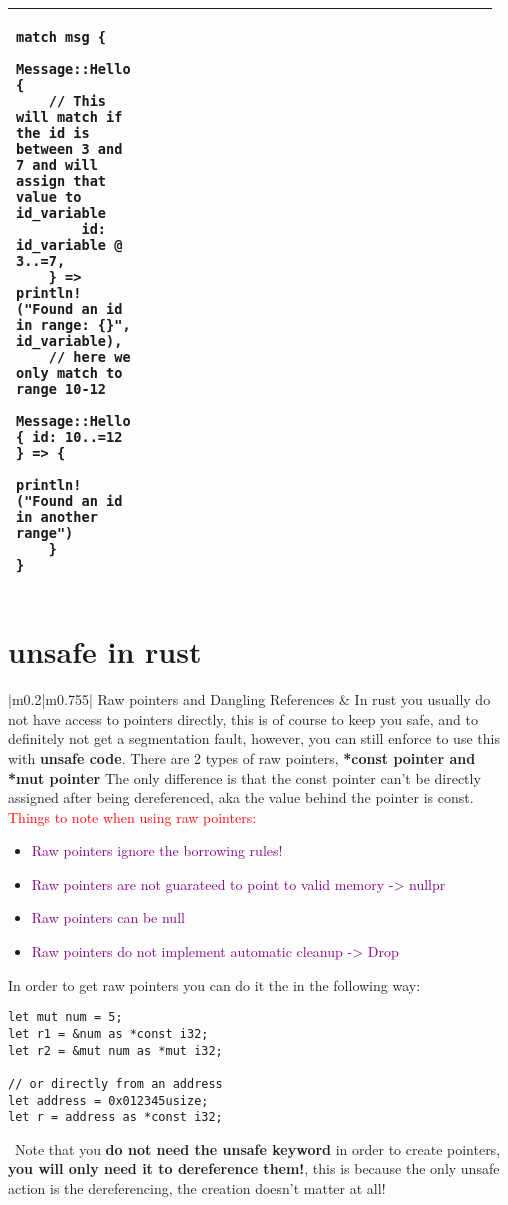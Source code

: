 \documentclass[main.tex,fontsize=8pt,paper=a4,paper=portrait,DIV=calc,]{scrartcl}
\begin{document}
\begin{table}[ht!]
\begin{tabular}{|m{0.2\linewidth}|m{0.755\linewidth}|}
\begin{lstlisting}
match msg {
    Message::Hello {
    // This will match if the id is between 3 and 7 and will assign that value to id_variable
        id: id_variable @ 3..=7,
    } => println!("Found an id in range: {}", id_variable),
    // here we only match to range 10-12
    Message::Hello { id: 10..=12 } => {
        println!("Found an id in another range")
    }
}
\end{lstlisting}\\
\hline
\end{tabular}
\section{unsafe in rust}
\begin{tabular}{|m{0.2\linewidth}|m{0.755\linewidth}|}
\hline
Raw pointers and Dangling References & 
In rust you usually do not have access to pointers directly, this is of course to keep you safe, and to definitely not get a segmentation fault, however, you can still enforce to use this with \textbf{unsafe code}. \newline
\textcolor{OliveGreen}{There are 2 types of  raw pointers, \textbf{*const pointer and *mut pointer}}\newline
The only difference is that the const pointer can't be directly assigned after being dereferenced, aka the value behind the pointer is const.\newline
\textcolor{red}{Things to note when using raw pointers:}\newline
\begin{itemize}
\item \textcolor{purple}{Raw pointers ignore the borrowing rules!}
\item \textcolor{purple}{Raw pointers are not guarateed to point to valid memory -> nullpr}
\item \textcolor{purple}{Raw pointers can be null}
\item \textcolor{purple}{Raw pointers do not implement automatic cleanup -> Drop}
\end{itemize} 
In order to get raw pointers you can do it the in the following way:\newline
\begin{lstlisting}
let mut num = 5;
let r1 = &num as *const i32;
let r2 = &mut num as *mut i32;

// or directly from an address
let address = 0x012345usize;
let r = address as *const i32;
\end{lstlisting} 
\, \newline
\textcolor{OliveGreen}{Note that you \textbf{do not need the unsafe keyword} in order to create pointers, \newline
\textbf{you will only need it to dereference them!}, this is because the only unsafe action is the dereferencing, the creation doesn't matter at all!}\\
\hline
\end{tabular}
\end{table}
\end{document}
